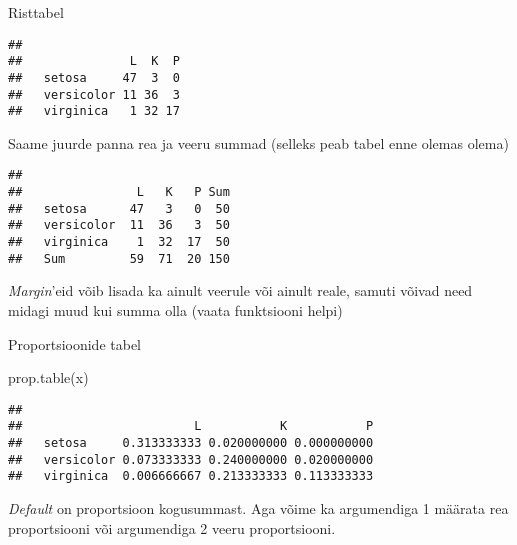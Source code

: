 \documentclass[
]{book}
\newenvironment{Shaded}{\begin{snugshade}}{\end{snugshade}}
\newcommand{\FunctionTok}[1]{\textcolor[rgb]{0.00,0.00,0.00}{#1}}
\newcommand{\NormalTok}[1]{#1}
\newcommand{\OtherTok}[1]{\textcolor[rgb]{0.56,0.35,0.01}{#1}}
\newcommand{\SpecialCharTok}[1]{\textcolor[rgb]{0.00,0.00,0.00}{#1}}
\begin{document}
Risttabel

\begin{Shaded}
\end{Shaded}

\begin{verbatim}
##             
##               L  K  P
##   setosa     47  3  0
##   versicolor 11 36  3
##   virginica   1 32 17
\end{verbatim}

Saame juurde panna rea ja veeru summad (selleks peab tabel enne olemas olema)

\begin{Shaded}
\end{Shaded}

\begin{verbatim}
##             
##                L   K   P Sum
##   setosa      47   3   0  50
##   versicolor  11  36   3  50
##   virginica    1  32  17  50
##   Sum         59  71  20 150
\end{verbatim}

\emph{Margin}'eid võib lisada ka ainult veerule või ainult reale, samuti võivad need midagi muud kui summa olla (vaata funktsiooni helpi)

Proportsioonide tabel

\begin{Shaded}
\begin{Highlighting}[]
\FunctionTok{prop.table}\NormalTok{(x)}
\end{Highlighting}
\end{Shaded}

\begin{verbatim}
##             
##                        L           K           P
##   setosa     0.313333333 0.020000000 0.000000000
##   versicolor 0.073333333 0.240000000 0.020000000
##   virginica  0.006666667 0.213333333 0.113333333
\end{verbatim}

\emph{Default} on proportsioon kogusummast. Aga võime ka argumendiga 1 määrata rea proportsiooni või argumendiga 2 veeru proportsiooni.
\end{document}
